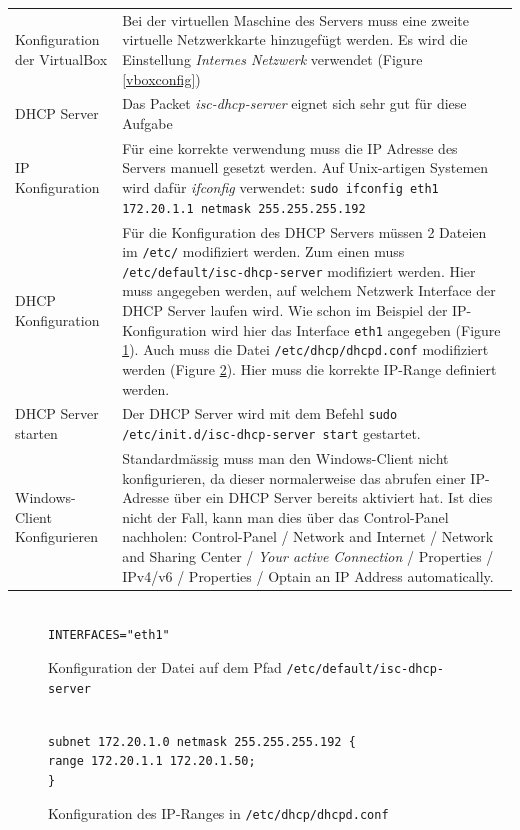 \documentclass[12pt,a4paper,twoside,titlepage]{article}
\begin{document}
        
        \begin{tabular}{lp{10cm}}
        	Konfiguration der VirtualBox & Bei der virtuellen Maschine des Servers muss eine zweite virtuelle Netzwerkkarte hinzugefügt werden. Es wird die Einstellung \textit{Internes Netzwerk} verwendet (Figure \ref{vboxconfig})\\
            DHCP Server & Das Packet \textit{isc-dhcp-server} eignet sich sehr gut für diese Aufgabe \\
            IP Konfiguration & Für eine korrekte verwendung muss die IP Adresse des Servers manuell gesetzt werden. Auf Unix-artigen Systemen wird dafür \textit{ifconfig} verwendet: \texttt{sudo ifconfig eth1 172.20.1.1 netmask 255.255.255.192}\\
            DHCP Konfiguration & Für die Konfiguration des DHCP Servers müssen 2 Dateien im \texttt{/etc/} modifiziert werden. Zum einen muss \texttt{/etc/default/isc-dhcp-server} modifiziert werden. Hier muss angegeben werden, auf welchem Netzwerk Interface der DHCP Server laufen wird. Wie schon im Beispiel der IP-Konfiguration wird hier das Interface \texttt{eth1} angegeben (Figure \ref{iscdhcpserver}). Auch muss die Datei \texttt{/etc/dhcp/dhcpd.conf} modifiziert werden (Figure \ref{dhcpdconf}). Hier muss die korrekte IP-Range definiert werden.\\
	        DHCP Server starten & Der DHCP Server wird mit dem Befehl \texttt{sudo /etc/init.d/isc-dhcp-server start} gestartet.\\
	        Windows-Client Konfigurieren & Standardmässig muss man den Windows-Client nicht konfigurieren, da dieser normalerweise das abrufen einer IP-Adresse über ein DHCP Server bereits aktiviert hat. Ist dies nicht der Fall, kann man dies über das Control-Panel nachholen: Control-Panel / Network and Internet / Network and Sharing Center / \textit{Your active Connection} / Properties / IPv4/v6 / Properties / Optain an IP Address automatically.
        \end{tabular}
        
        

		\begin{figure}
			\hrulefill\\
			\texttt{INTERFACES="eth1"}
			\caption{\label{iscdhcpserver} Konfiguration der Datei auf dem Pfad \texttt{/etc/default/isc-dhcp-server}}
			\hrulefill
		\end{figure}
		
		\begin{figure}
			\hrulefill\\
			\texttt{subnet 172.20.1.0 netmask 255.255.255.192 \{\\\hspace*{8pt} range 172.20.1.1 172.20.1.50;\\\}}\\
			\caption{\label{dhcpdconf} Konfiguration des IP-Ranges in \texttt{/etc/dhcp/dhcpd.conf}}
			\hrulefill
		\end{figure}
\end{document}
